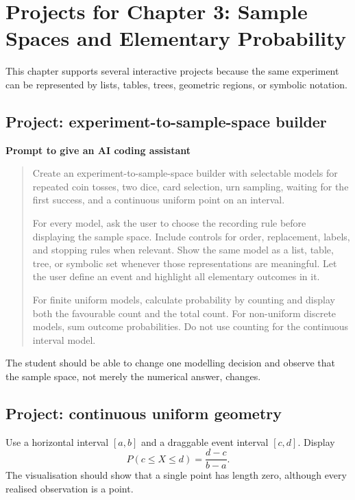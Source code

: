 \section{Projects for Chapter 3: Sample Spaces and Elementary Probability}

This chapter supports several interactive projects because the same experiment can be represented by lists, tables, trees, geometric regions, or symbolic notation.

\subsection*{Project: experiment-to-sample-space builder}

\begin{examplebox}
\textbf{Prompt to give an AI coding assistant}

\begin{quote}\small
Create an experiment-to-sample-space builder with selectable models for repeated coin tosses, two dice, card selection, urn sampling, waiting for the first success, and a continuous uniform point on an interval.

For every model, ask the user to choose the recording rule before displaying the sample space. Include controls for order, replacement, labels, and stopping rules when relevant. Show the same model as a list, table, tree, or symbolic set whenever those representations are meaningful. Let the user define an event and highlight all elementary outcomes in it.

For finite uniform models, calculate probability by counting and display both the favourable count and the total count. For non-uniform discrete models, sum outcome probabilities. Do not use counting for the continuous interval model.
\end{quote}
\end{examplebox}

The student should be able to change one modelling decision and observe that the sample space, not merely the numerical answer, changes.

\subsection*{Project: continuous uniform geometry}

Use a horizontal interval \([a,b]\) and a draggable event interval \([c,d]\). Display
\[
P(c\leq X\leq d)=\frac{d-c}{b-a}.
\]
The visualisation should show that a single point has length zero, although every realised observation is a point.

